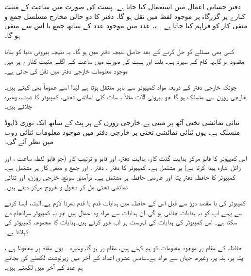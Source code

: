 دفتر  حسابی   اعمال میں  استعمال کیا جاتا ہے۔ پست  کی صورت میں ساعت کے مثبت کنارے  پر  گزرگاہ پر موجود لفظ  میں نقل ہو گا۔ دفتر  کا دو حالی مخارج مسلسل جمع و منفی کار کو فراہم کیا جاتا ہے ۔ یہ عدد  میں موجود عدد کے ساتھ جمع یا اس سے منفی ہو گا۔

کسی بھی مسئلے کو حل کرنے کے بعد حاصل نتیجہ دفتر  میں     ہو گا۔ یہ نتیجہ بیرونی دنیا کو بتانا مقصود ہو گا۔یہ کام  کے سپرد ہے۔ بلند  اور پست  کی صورت میں ساعت کے  اگلے  مثبت کنارے پر  میں موجود معلومات خارجی دفتر میں نقل کی جاتی ہے۔

چونکہ خارجی دفتر کے ذریعہ    مواد کمپیوٹر سے باہر منتقل ہوتا ہے لہٰذا اسے عموماً بھی  کہتے ہیں۔ خارجی روزن   سے منسلک ہو گا جو بیرونی آلات  مثلاً  ،   سات کلی نمائشی تختی،  کمپیوٹر کا شیشہ، وغیرہ چلاتے ہیں۔

ثنائی نمائشی تختی  آٹھ  پر مبنی ہے۔خارجی  روزن کے ہر بِٹ کے ساتھ ایک نوری ڈایوڈ منسلک ہے۔ یوں ثنائی نمائشی تختی  پر خارجی دفتر میں موجود  معلومات    ثنائی روپ میں نظر آئے گی۔

اس کمپیوٹر کا قابو مرکز ہدایت گنت کار، ہدایت دفتر، اور قابو و ترتیب کار  (جو قابو لفظ، ساعت ، اور زائل  اشارہ   پیدا کرتا ہے) پر مشتمل ہے۔ کمپیوٹر کا  دفتر ، دفتر ، اور جمع و منفی کار پر مشتمل ہے۔کمپیوٹر کا حافظہ  دفتر پتہ اور  عارضی حافظہ پر مشتمل ہے۔  درآمدی  سوئچ، خارجی روزن، اور ثنائی نمائشی تختی  مل کر   دخول و خروج مرکز دیتے ہیں۔

کمپیوٹر کی با مقصد دوڑ سے قبل اس کے حافظہ  میں ہدایات قدم با قدم  بھرنا لازم ہے۔البتہ، ایسا کرنے سے پہلے  آپ کو یہ ہدایات  جاننی  ہو گی۔ان ہدایات سے مراد وہ اعمال ہیں جو یہ کمپیوٹر سرانجام دے سکتا ہے۔ اس کمپیوٹر کی ہدایات کی فہرست  پر اب غور کرتے ہیں۔ہدایات کا مجموعہ کمپیوٹر کی  کہلاتا ہے۔

حافظہ کے مقام  پر موجود معلومات کو ہم   کہتے ہیں، مقام  پر   ہو گا، وغیرہ ۔ یوں  مقام  پر محفوظ ہے ،  پتہ  پر،  پتہ  پر، وغیرہ، جہاں  سے مراد    ہے۔سادس عشری  اعداد کے آخر میں  زیرنوشت  لکھنے کی بجائے ہم عدد کے آخر میں  لکھتے ہیں۔

